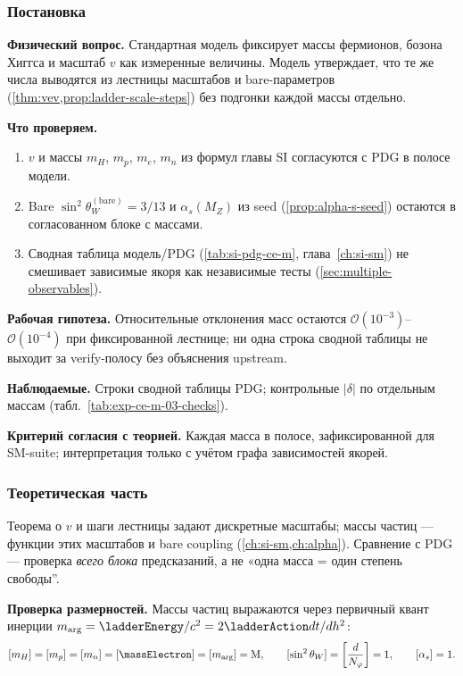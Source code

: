 \label{exp:cem03}

\subsubsection*{Постановка}
\textbf{Физический вопрос.}
Стандартная модель фиксирует массы фермионов, бозона Хиггса и масштаб $v$ как измеренные величины.
Модель утверждает, что те же числа выводятся из лестницы масштабов и bare-параметров (\cref{thm:vev,prop:ladder-scale-steps}) без подгонки каждой массы отдельно.

\textbf{Что проверяем.}
\begin{enumerate}[label=\textbf{(\alph*)},leftmargin=*,itemsep=0.25em]
\item $v$ и массы $m_H$, $m_p$, $m_e$, $m_n$ из формул главы SI согласуются с PDG в полосе модели.
\item Bare $\sin^2\theta_W^{(\mathrm{bare})}=3/13$ и $\alpha_s(M_Z)$ из seed (\cref{prop:alpha-s-seed}) остаются в согласованном блоке с массами.
\item Сводная таблица модель/PDG (\cref{tab:si-pdg-ce-m}, глава~\cref{ch:si-sm}) не смешивает зависимые якоря как независимые тесты (\cref{sec:multiple-observables}).
\end{enumerate}

\textbf{Рабочая гипотеза.}
Относительные отклонения масс остаются $\mathcal{O}(10^{-3})$--$\mathcal{O}(10^{-4})$ при фиксированной лестнице; ни одна строка сводной таблицы не выходит за verify-полосу без объяснения upstream.

\textbf{Наблюдаемые.}
Строки сводной таблицы PDG; контрольные $|\delta|$ по отдельным массам (табл.~\ref{tab:exp-ce-m-03-checks}).

\textbf{Критерий согласия с теорией.}
Каждая масса в полосе, зафиксированной для SM-suite; интерпретация только с учётом графа зависимостей якорей.

\subsubsection*{Теоретическая часть}
Теорема о $v$ и шаги лестницы задают дискретные масштабы; массы частиц --- функции этих масштабов и bare coupling (\cref{ch:si-sm,ch:alpha}).
Сравнение с PDG --- проверка \emph{всего блока} предсказаний, а не «одна масса = один степень свободы''.

\textbf{Проверка размерностей.}
Массы частиц выражаются через первичный квант инерции $m_{\arg} = \ladderEnergy/c^2 = 2\ladderAction dt/dh^2$:
\[
  [m_H] = [m_p] = [m_n] = [\massElectron] = [m_{\arg}] = \mathrm{M},\qquad
  [\sin^2\theta_W] = \left[\frac{d}{N_\varphi}\right] = 1,\qquad
  [\alpha_s] = 1.
\]

